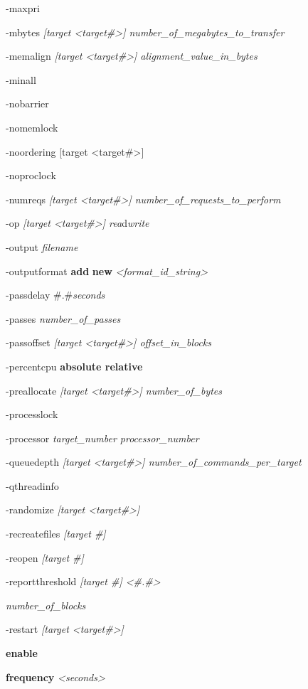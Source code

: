 -maxpri

-mbytes \emph{{[}target \textless target\#\textgreater{]} number\_of\_megabytes\_to\_transfer}

-memalign \emph{{[}target \textless target\#\textgreater{]} alignment\_value\_in\_bytes}

-minall

-nobarrier

-nomemlock

-noordering {[}target \textless target\#\textgreater{]}

-noproclock

-numreqs \emph{{[}target \textless target\#\textgreater{]} number\_of\_requests\_to\_perform}

-op \emph{{[}target \textless target\#\textgreater{]} rea}d\textbar{}\emph{write}

-output \emph{filename}

-outputformat \textbf{add} \emph{\textbar{}} \textbf{new} \emph{\textless format\_id\_string\textgreater{}}

-passdelay \#.\#\emph{seconds}

-passes \emph{number\_of\_passes}

-passoffset \emph{{[}target \textless target\#\textgreater{]} offset\_in\_blocks}

-percentcpu \textbf{absolute \textbar{} relative}

-preallocate \emph{{[}target \textless target\#\textgreater{]} number\_of\_bytes}

-processlock

-processor \emph{target\_number processor\_number}

-queuedepth \emph{{[}target \textless target\#\textgreater{]} number\_of\_commands\_per\_target}

-qthreadinfo

-randomize \emph{{[}target \textless target\#\textgreater{]}}

-recreatefiles \emph{{[}target \#{]}}

-reopen \emph{{[}target \#{]}}

-reportthreshold \emph{{[}target \#{]} \textless\#.\#\textgreater{}}

\emph{number\_of\_blocks}

-restart \emph{{[}target \textless target\#\textgreater{]}}

\textbf{enable}

\textbf{frequency} \emph{\textless seconds\textgreater{}}

